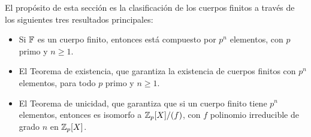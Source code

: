 El propósito de esta sección es la clasificación de los cuerpos finitos a través de los siguientes tres resultados principales: 
\begin{itemize}[label={--}]
    \item Si $\mathbb{F}$ es un cuerpo finito, entonces está compuesto por $p^n$ elementos, con $p$ primo y $n\geq 1$.
    \item El Teorema de existencia, que garantiza la existencia de cuerpos finitos con $p^n$ elementos, para todo $p$ primo y $n\geq 1$.
    \item El Teorema de unicidad, que garantiza que si un cuerpo finito tiene $p^n$ elementos, entonces es isomorfo a $\mathbb{Z}_p[X]/(f)$, con $f$ polinomio irreducible de grado $n$ en $\mathbb{Z}_p[X]$.
\end{itemize}

\begin{teorema}\label{teorema:cuerpo_finito_p^n_elementos}\end{teorema}

